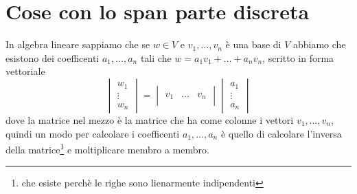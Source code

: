 \documentclass[11pt,a4paper]{article}
\theoremstyle{definition}
\theoremstyle{plain}
\theoremstyle{plain}
\begin{document}
		\section{Cose con lo span parte discreta}
			In algebra lineare sappiamo che se $w\in V$ e ${v_1,\dots,v_n}$ è una base di $V$ abbiamo che esistono dei coefficenti $a_1,\dots,a_n$ tali che $w=a_1 v_1+\dots +a_n v_n$, scritto in forma vettoriale
			\begin{equation}
				\begin{vmatrix}
					w_1\\
					\vdots\\
					w_n
				\end{vmatrix}
				=
				\begin{vmatrix}
					& & \\
					v_1 & \dots & v_n\\
					& & 
				\end{vmatrix}
				\begin{vmatrix}
					a_1\\
					\vdots\\
					a_n
				\end{vmatrix}
			\end{equation}
			dove la matrice nel mezzo è la matrice che ha come colonne i vettori $v_1,\dots,v_n$, quindi un modo per calcolare i coefficenti $a_1,\dots,a_n$ è quello di calcolare l'inversa della matrice\footnote{che esiste perchè le righe sono lienarmente indipendenti} e moltiplicare membro a membro.\newline
\end{document}
